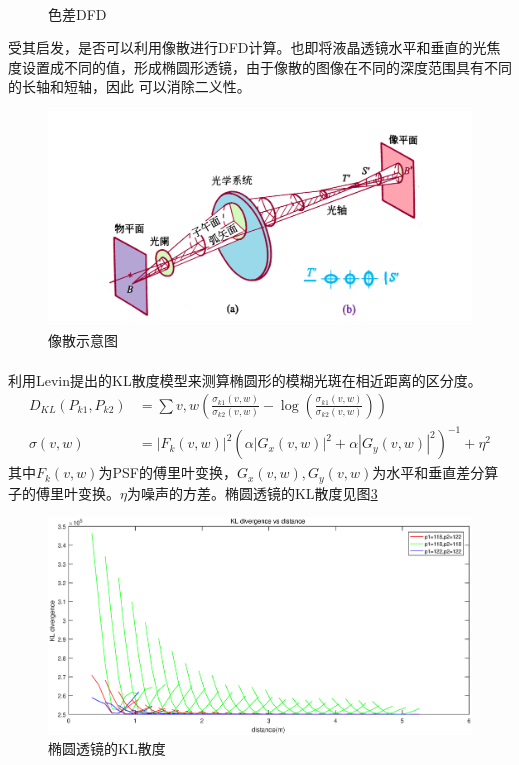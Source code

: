 \documentclass[UTF8]{ctexart}
\newcommand{\myciteup}[1]{\textsuperscript{\textsuperscript{\cite{#1}}}}
\begin{document}
\begin{sloppypar}
\begin{figure}[htbp]
{            }
            \caption{\small 色差DFD\myciteup{buat2020active}}
            \label{fig:activechromatic}
        \end{figure}
        受其启发，是否可以利用像散进行DFD计算。也即将液晶透镜水平和垂直的光焦度设置成不同的值，形成椭圆形透镜，由于像散的图像在不同的深度范围具有不同的长轴和短轴，因此
        可以消除二义性。
        \begin{figure}[htbp]
            \includegraphics[width=0.9\linewidth]{figure/Astigmatism}
            \caption{\small 像散示意图\myciteup{yeOptics}}
            \label{fig:astigmatism}
        \end{figure}
        利用Levin\myciteup{levin2007image}提出的KL散度模型来测算椭圆形的模糊光斑在相近距离的区分度。
        \begin{equation}
            \begin{aligned}
            D_{KL}(P_{k1},P_{k2}) &= \sum\limits{v,w}(\frac{\sigma_{k1}(v,w)}{\sigma_{k2}(v,w)} - \log (\frac{\sigma_{k1}(v,w)}{\sigma_{k2}(v,w)}))\\
            \sigma(v,w) &= \left | F_k(v,w) \right |^2(\alpha\left | G_x(v,w) \right |^2 + \alpha \left | G_y(v,w) \right |^2)^{-1} + \eta^2
            \end{aligned}
        \end{equation}
        其中$F_k(v,w)$为PSF的傅里叶变换，$G_x(v,w),G_y(v,w)$为水平和垂直差分算子的傅里叶变换。$\eta$为噪声的方差。椭圆透镜的KL散度见图\ref{fig:EclipseKl}
        \begin{figure}[htbp]
            \includegraphics[width=0.9\linewidth]{figure/kldivergence_vs_distance}
            \caption{\small 椭圆透镜的KL散度}
            \label{fig:EclipseKl}
        \end{figure}

\end{sloppypar}
\end{document}
